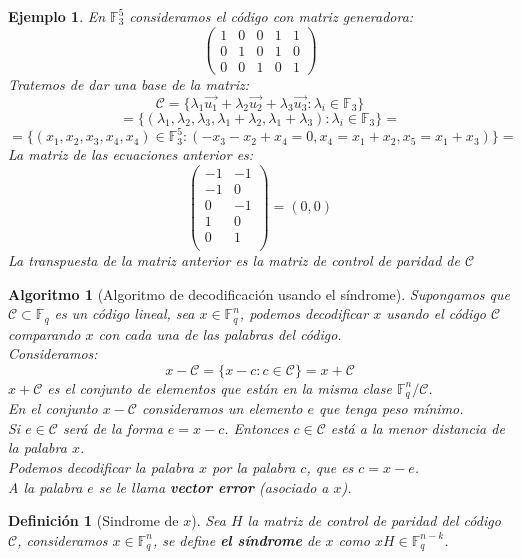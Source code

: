 \documentclass[spanish]{book}
\newtheorem{alg}{Algoritmo}
\newtheorem{mydef}{Definición}
\newtheorem{ejem}{Ejemplo}
\begin{document}
\begin{ejem}
	En $\mathbb{F}_3^5$ consideramos el código con matriz generadora:
	$$
	\left(
	\begin{array}{ccccc}
	1 & 0 & 0 & 1 & 1 \\
	0 & 1 & 0 & 1 & 0 \\
	0 & 0 & 1 & 0 & 1
	\end{array} \right)
	$$
	Tratemos de dar una base de la matriz:
	$$ \mathcal{C}=\{\lambda_1 \vec{u_1} + \lambda_2 \vec{u_2}+\lambda_3\vec{u_3} : \lambda_i \in \mathbb{F}_3\}$$
	$$=\{(\lambda_1, \lambda_2, \lambda_3, \lambda_1+\lambda_2, \lambda_1+\lambda_3) : \lambda_i \in \mathbb{F}_3\}=$$
	$$=\{(x_1, x_2, x_3, x_4, x_4) \in \mathbb{F}_3^5: (-x_3-x_2+x_4=0, x_4=x_1+x_2, x_5=x_1+x_3)\}=$$
	La matriz de las ecuaciones anterior es:
	$$
	\left(
	\begin{array}{cc}
		-1 & -1 \\
		-1 & 0 \\
		0 & -1 \\
		1 & 0 \\
		0 & 1 \\
	\end{array} \right)=(0,0)
	$$
	La transpuesta de la matriz anterior es la matriz de control de paridad de $\mathcal{C}$
\end{ejem}

\begin{alg}[Algoritmo de decodificación usando el síndrome]
	Supongamos que $\mathcal{C} \subset \mathbb{F}_q$ es un código lineal, sea $x \in \mathbb{F}_q^n$, podemos decodificar $x$ usando el código $\mathcal{C}$ comparando $x$ con cada una de las palabras del código. \\
	Consideramos:
	$$ x-\mathcal{C}=\{x-c : c \in \mathcal{C}\}=x+\mathcal{C}$$
	$x + \mathcal{C}$ es el conjunto de elementos que están en la misma clase $\mathbb{F}_q^n / \mathcal{C}$. \\
	En el conjunto $x-\mathcal{C}$ consideramos un elemento $e$ que tenga peso mínimo. \\
	Si $e \in \mathcal{C}$ será de la forma $e=x-c$. Entonces $c \in \mathcal{C}$ está a la menor distancia  de la palabra $x$. \\
	Podemos decodificar la palabra $x$ por la palabra $c$, que es $c=x-e$. \\
	A la palabra $e$ se le llama \textbf{vector error} (asociado a $x$).
\end{alg}


\begin{mydef}[Sindrome de $x$]
	Sea $H$ la matriz de control de paridad del código $\mathcal{C}$, consideramos $x \in \mathbb{F}_q^n$, se define \textbf{el síndrome} de $x$ como $x H \in \mathbb{F}_q^{n-k}$.
\end{mydef}
\end{document}
